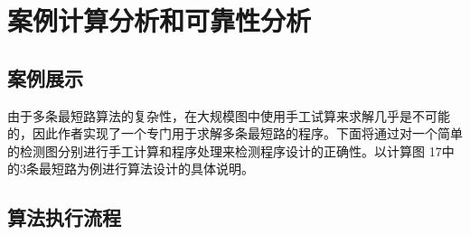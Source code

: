 \chapter{案例计算分析和可靠性分析}\label{ch:案例计算分析和可靠性分析}


\section{案例展示}\label{sec:案例展示}
由于多条最短路算法的复杂性，在大规模图中使用手工试算来求解几乎是不可能的，因此作者实现了一个专门用于求解多条最短路的程序。下面将通过对一个简单的检测图分别进行手工计算和程序处理来检测程序设计的正确性。以计算图 17中的3条最短路为例进行算法设计的具体说明。


\section{算法执行流程}\label{sec:算法执行流程}
